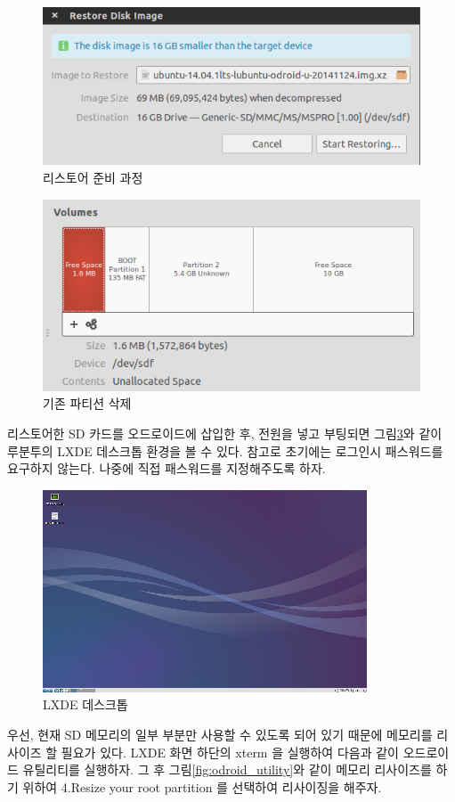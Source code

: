 \begin{figure}[h]
\centering\includegraphics[width=0.49\columnwidth]{pictures/chapter3/odroid_restore.png}
\caption{리스토어 준비 과정}
\label{fig:open_img}
\end{figure}

\begin{figure}[h]
\centering
\includegraphics[width=0.5\columnwidth]{pictures/chapter3/odroid_partition3.png}
\caption{기존 파티션 삭제}
\label{fig:partition_new}
\end{figure}

리스토어한 SD 카드를 오드로이드에 삽입한 후, 전원을 넣고 부팅되면 그림\ref{fig:lxde}와 같이 루분투의 LXDE 데스크톱 환경을 볼 수 있다. 참고로 초기에는 로그인시 패스워드를 요구하지 않는다. 나중에 직접 패스워드를 지정해주도록 하자.

\begin{figure}[h]
\centering\includegraphics[width=0.5\columnwidth]{pictures/chapter3/odroid_LXDE.png}
\caption{LXDE 데스크톱}
\label{fig:lxde}
\end{figure}

우선, 현재 SD 메모리의 일부 부분만 사용할 수 있도록 되어 있기 때문에 메모리를 리사이즈 할 필요가 있다. LXDE 화면 하단의 xterm 을 실행하여 다음과 같이 오드로이드 유틸리티를 실행하자. 그 후 그림\ref{fig:odroid_utility}와 같이 메모리 리사이즈를 하기 위하여 4.Resize your root partition 를 선택하여 리사이징을 해주자.

